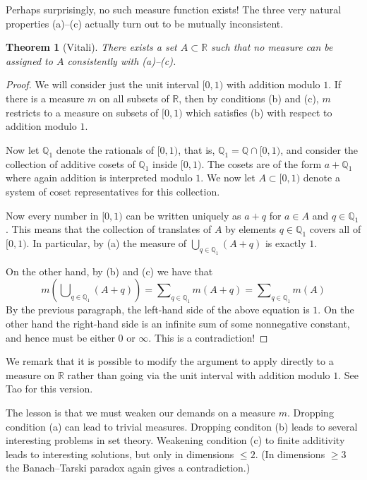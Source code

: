 \documentclass[11pt,oneside]{amsbook}
\newcommand{\QQ}{\mathbb Q}
\newcommand{\RR}{\mathbb R}
\theoremstyle{definition}
\theoremstyle{plain}
\newtheorem{thm}{Theorem}[section]
\theoremstyle{definition}
\theoremstyle{remark}
\numberwithin{equation}{section}
\numberwithin{figure}{section}
\begin{document}
Perhaps surprisingly, no such measure function exists! The three very natural properties (a)--(c) actually turn out to be mutually inconsistent.

\begin{thm}[Vitali]
  There exists a set $A\subset\RR$ such that no measure can be assigned to $A$ consistently with (a)--(c).
\end{thm}

\begin{proof}
  We will consider just the unit interval $[0,1)$ with addition modulo $1$. If there is a measure $m$ on all subsets of $\RR$, then by conditions (b) and (c), $m$ restricts to a measure on subsets of $[0,1)$ which satisfies (b) with respect to addition modulo $1$.

  Now let $\QQ_1$ denote the rationals of $[0,1)$, that is, $\QQ_1=\QQ\cap[0,1)$, and consider the collection of additive cosets of $\QQ_1$ inside $[0,1)$. The cosets are of the form $a+\QQ_1$ where again addition is interpreted modulo $1$. We now let $A\subset[0,1)$ denote a system of coset representatives for this collection.

  Now every number in $[0,1)$ can be written uniquely as $a+q$ for $a\in A$ and $q\in\QQ_1$. This means that the collection of translates of $A$ by elements $q\in\QQ_1$ covers all of $[0,1)$. In particular, by (a) the measure of $\bigcup_{q\in\QQ_1}(A+q)$ is exactly $1$.

  On the other hand, by (b) and (c) we have that
  \[m\left(\bigcup\nolimits_{q\in\QQ_1}(A+q)\right)
  =\sum\nolimits_{q\in\QQ_1}m(A+q)=\sum\nolimits_{q\in\QQ_1}m(A)
  \]
  By the previous paragraph, the left-hand side of the above equation is $1$. On the other hand the right-hand side is an infinite sum of some nonnegative constant, and hence must be either $0$ or $\infty$. This is a contradiction!
\end{proof}

We remark that it is possible to modify the argument to apply directly to a measure on $\RR$ rather than going via the unit interval with addition modulo $1$. See Tao for this version.

The lesson is that we must weaken our demands on a measure $m$. Dropping condition (a) can lead to trivial measures. Dropping conditon (b) leads to several interesting problems in set theory. Weakening condition (c) to finite additivity leads to interesting solutions, but only in dimensions $\leq2$. (In dimensions $\geq3$ the Banach--Tarski paradox again gives a contradiction.)
\end{document}

